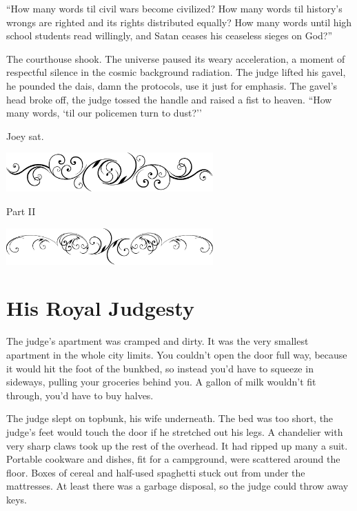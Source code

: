 \documentclass[oneside]{book}
\begin{document}
``How many words til civil wars become civilized? 
How many words til history's wrongs are righted and its rights distributed equally?
How many words until high school students read willingly, 
and Satan ceases his ceaseless sieges on God?''

The courthouse shook.
The universe paused its weary
acceleration, a moment of respectful silence in the cosmic background radiation.
The judge lifted his gavel, he pounded the dais,
damn the protocols, use it just for emphasis.  The gavel's head broke off,
the judge tossed the handle and raised a fist to heaven.
``How many words, `til our policemen turn to dust?''

Joey sat.

\clearpage

\thispagestyle{empty}

{
\center
\includegraphics[width=300px]{yydiv.eps}
\par
}

\vspace{.1in}

{
\center
\Huge
Part II
\par
}

\vspace{.25in}
{
\center
\includegraphics[width=300px]{slashdiv.eps}
\par
}


\chapter{His Royal Judgesty}


The judge's apartment was cramped and dirty.
It was the very smallest apartment in the whole city limits.
You couldn't open the door full way, because it would hit
the foot of the bunkbed, so instead you'd have to squeeze in
sideways, pulling your groceries behind you.
A gallon of milk wouldn't fit through, you'd have
to buy halves.

The judge slept on topbunk, his wife underneath.
The bed was too short, the judge's feet would touch
the door if he stretched out his legs.
A chandelier with very sharp claws took up the rest
of the overhead.  It had ripped up many a suit.
Portable cookware and dishes, fit for a campground,
were scattered around the floor.
Boxes of cereal and half-used spaghetti stuck out
from under the mattresses.  At least there was
a garbage disposal, so the judge could throw away keys.
\end{document}
